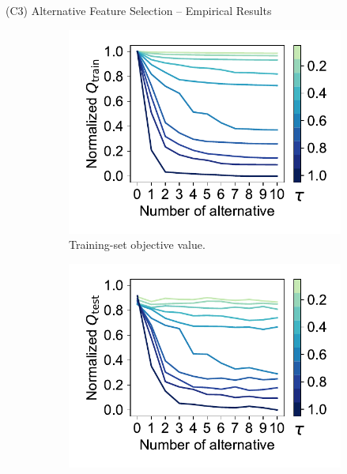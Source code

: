 \documentclass[en, navbarinline, handout]{sdqbeamer}
\begin{document}
\begin{frame}[t]{(C3) Alternative Feature Selection -- Empirical Results}
	\begin{figure}
		\centering
		\begin{subfigure}[t]{0.32\textwidth}
			\centering
			\includegraphics[width=\textwidth, trim={15 15 10 15}, clip]{plots/afs-impact-num-alternatives-tau-train-objective-max-fillna.pdf}
			\caption{Training-set objective value.}
		\end{subfigure}
		\hfill
		\begin{subfigure}[t]{0.32\textwidth}
			\centering
			\includegraphics[width=\textwidth, trim={15 15 10 15}, clip]{plots/afs-impact-num-alternatives-tau-test-objective-max-fillna.pdf}

\end{subfigure}
\end{figure}
\end{frame}
\end{document}
